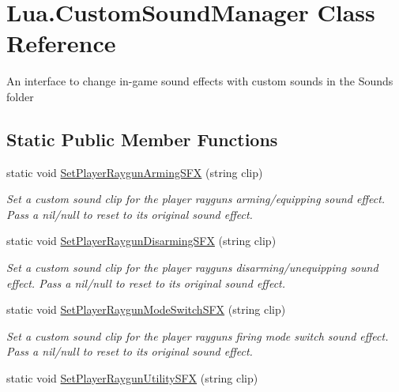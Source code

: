\hypertarget{class_lua_1_1_custom_sound_manager}{}\section{Lua.\+Custom\+Sound\+Manager Class Reference}
\label{class_lua_1_1_custom_sound_manager}


An interface to change in-\/game sound effects with custom sounds in the Sounds folder  


\subsection*{Static Public Member Functions}
\begin{DoxyCompactItemize}
\item 
static void \mbox{\hyperlink{class_lua_1_1_custom_sound_manager_a77518b2fe52893bc0d3b7473d5ac33d8}{Set\+Player\+Raygun\+Arming\+S\+FX}} (string clip)
\begin{DoxyCompactList}\small\item\em Set a custom sound clip for the player raygun\textquotesingle{}s arming/equipping sound effect. Pass a nil/null to reset to its original sound effect. \end{DoxyCompactList}\item 
static void \mbox{\hyperlink{class_lua_1_1_custom_sound_manager_aedbcce119473f77ce87a9742c2a3bd2d}{Set\+Player\+Raygun\+Disarming\+S\+FX}} (string clip)
\begin{DoxyCompactList}\small\item\em Set a custom sound clip for the player raygun\textquotesingle{}s disarming/unequipping sound effect. Pass a nil/null to reset to its original sound effect. \end{DoxyCompactList}\item 
static void \mbox{\hyperlink{class_lua_1_1_custom_sound_manager_a6ad73ad3423d997434d87a1829f9d910}{Set\+Player\+Raygun\+Mode\+Switch\+S\+FX}} (string clip)
\begin{DoxyCompactList}\small\item\em Set a custom sound clip for the player raygun\textquotesingle{}s firing mode switch sound effect. Pass a nil/null to reset to its original sound effect. \end{DoxyCompactList}\item 
static void \mbox{\hyperlink{class_lua_1_1_custom_sound_manager_aa79c6dbaef8130988fcdebb2437cb36e}{Set\+Player\+Raygun\+Utility\+S\+FX}} (string clip)

\end{DoxyCompactItemize}
